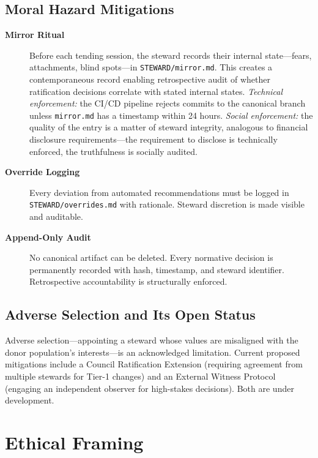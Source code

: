 \documentclass[12pt,a4paper]{article}
\theoremstyle{definition}
\theoremstyle{remark}
\begin{document}
\subsection{Moral Hazard Mitigations}

\begin{description}
\item[\textbf{Mirror Ritual}] Before each tending session, the steward records their
  internal state—fears, attachments, blind spots—in \texttt{STEWARD/mirror.md}. This
  creates a contemporaneous record enabling retrospective audit of whether ratification
  decisions correlate with stated internal states. \emph{Technical enforcement:} the
  CI/CD pipeline rejects commits to the canonical branch unless \texttt{mirror.md} has
  a timestamp within 24 hours. \emph{Social enforcement:} the quality of the entry is
  a matter of steward integrity, analogous to financial disclosure requirements—the
  requirement to disclose is technically enforced, the truthfulness is socially audited.

\item[\textbf{Override Logging}] Every deviation from automated recommendations must
  be logged in \texttt{STEWARD/overrides.md} with rationale. Steward discretion is
  made visible and auditable.

\item[\textbf{Append-Only Audit}] No canonical artifact can be deleted. Every
  normative decision is permanently recorded with hash, timestamp, and steward
  identifier. Retrospective accountability is structurally enforced.
\end{description}

\subsection{Adverse Selection and Its Open Status}

Adverse selection—appointing a steward whose values are misaligned with the donor
population's interests—is an acknowledged limitation. Current proposed mitigations
include a Council Ratification Extension (requiring agreement from multiple stewards
for Tier-1 changes) and an External Witness Protocol (engaging an independent observer
for high-stakes decisions). Both are under development.

\section{Ethical Framing}
\label{sec:ethics}
\end{document}
